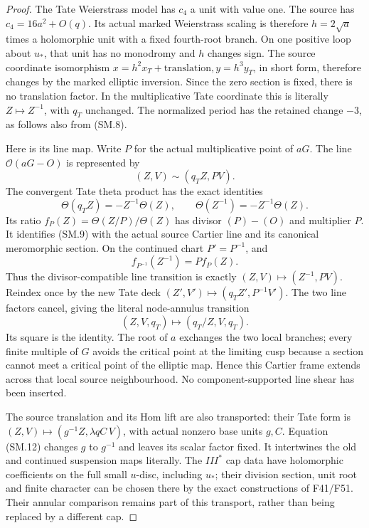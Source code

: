 \begin{proof}
The Tate Weierstrass model has \(c_4\) a unit with value one.
The source has \(c_4=16a^2+O(q)\). Its actual marked
Weierstrass scaling is therefore \(h=2\sqrt a\) times a
holomorphic unit with a fixed fourth-root branch. On one
positive loop about \(u_*\), that unit has no monodromy and
\(h\) changes sign. The source coordinate isomorphism
\(x=h^2x_T+\text{translation},y=h^3y_T\), in short form,
therefore changes by the marked elliptic inversion.
Since the zero section is fixed, there is no translation
factor. In the multiplicative Tate coordinate this is
literally \(Z\mapsto Z^{-1}\), with \(q_T\) unchanged.
The normalized period has the retained change \(-3\),
as follows also from (SM.8).

Here is its line map. Write \(P\) for the actual multiplicative
point of \(aG\). The line \(\mathcal O(aG-O)\) is represented by
\[
       (Z,V)\sim(q_T Z,P V).
 \tag{SM.9}
\]
The convergent Tate theta product has the exact identities
\[
 \Theta(q_TZ)=-Z^{-1}\Theta(Z),\qquad
 \Theta(Z^{-1})=-Z^{-1}\Theta(Z).
 \tag{SM.10}
\]
Its ratio \(f_P(Z)=\Theta(Z/P)/\Theta(Z)\) has divisor
\((P)-(O)\) and multiplier \(P\). It identifies (SM.9)
with the actual source Cartier line and its canonical
meromorphic section. On the continued chart \(P'=P^{-1}\),
and
\[
 f_{P^{-1}}(Z^{-1})=P f_P(Z).
 \tag{SM.11}
\]
Thus the divisor-compatible line transition is exactly
\((Z,V)\mapsto(Z^{-1},PV)\). Reindex once by the new
Tate deck \((Z',V')\mapsto(q_TZ',P^{-1}V')\).
The two line factors cancel, giving the literal
node-annulus transition
\[
                (Z,V,q_T)\longmapsto(q_T/Z,V,q_T).
 \tag{SM.12}
\]
Its square is the identity. The root of \(a\) exchanges
the two local branches; every finite multiple of \(G\)
avoids the critical point at the limiting cusp because a
section cannot meet a critical point of the elliptic
map. Hence this Cartier frame extends across that local
source neighbourhood. No component-supported line shear
has been inserted.

The source translation and its Hom lift are also transported:
their Tate form is
\((Z,V)\mapsto(g^{-1}Z,\lambda q C\,V)\), with actual
nonzero base units \(g,C\). Equation (SM.12) changes
\(g\) to \(g^{-1}\) and leaves its scalar factor fixed.
It intertwines the old and continued suspension maps
literally. The \(III^*\) cap data have holomorphic
coefficients on the full small \(u\)-disc, including
\(u_*\); their division section, unit root and finite
character can be chosen there by the exact constructions
of F41/F51. Their annular comparison remains part of
this transport, rather than being replaced by a different
cap.


\end{proof}
